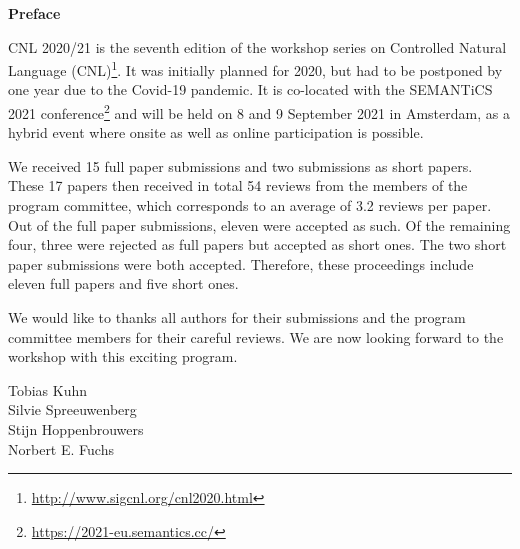\documentclass[11pt,a4paper]{article}
\begin{document}
\begin{center}
  {\Large \bf Preface}
\end{center}

\vspace*{0.5cm}

CNL 2020/21 is the seventh edition of the workshop series on Controlled Natural Language (CNL)\footnote{\url{http://www.sigcnl.org/cnl2020.html}}. It was initially planned for 2020, but had to be postponed by one year due to the Covid-19 pandemic. It is co-located with the SEMANTiCS 2021 conference\footnote{\url{https://2021-eu.semantics.cc/}} and will be held on 8 and 9 September 2021 in Amsterdam, as a hybrid event where onsite as well as online participation is possible.

We received 15 full paper submissions and two submissions as short papers. These 17 papers then received in total 54 reviews from the members of the program committee, which corresponds to an average of 3.2 reviews per paper. Out of the full paper submissions, eleven were accepted as such. Of the remaining four, three were rejected as full papers but accepted as short ones. The two short paper submissions were both accepted. Therefore, these proceedings include eleven full papers and five short ones.

We would like to thanks all authors for their submissions and the program committee members for their careful reviews. We are now looking forward to the workshop with this exciting program.

Tobias Kuhn\\
Silvie Spreeuwenberg\\
Stijn Hoppenbrouwers\\
Norbert E. Fuchs\\
 
\end{document}
